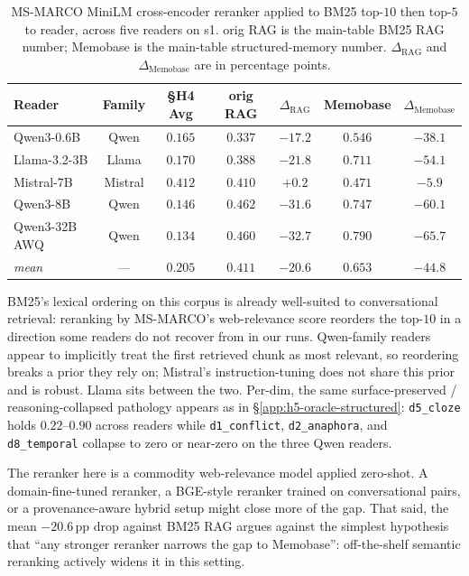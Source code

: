 \begin{table}[h]
\centering
\small
\caption{MS-MARCO MiniLM cross-encoder reranker applied to BM25 top-$10$ then top-$5$ to reader, across five readers on \benchL s1. orig RAG is the main-table BM25 RAG number; Memobase is the main-table structured-memory number. $\Delta_{\text{RAG}}$ and $\Delta_{\text{Memobase}}$ are in percentage points.}
\label{tab:h4-reranker-baseline}
\begin{tabular}{lcccccc}
\toprule
Reader & Family & \S H4 Avg & orig RAG & $\Delta_{\text{RAG}}$ & Memobase & $\Delta_{\text{Memobase}}$ \\
\midrule
Qwen3-0.6B    & Qwen    & $0.165$ & $0.337$ & $-17.2$ & $0.546$ & $-38.1$ \\
Llama-3.2-3B  & Llama   & $0.170$ & $0.388$ & $-21.8$ & $0.711$ & $-54.1$ \\
Mistral-7B    & Mistral & $0.412$ & $0.410$ & $+0.2$  & $0.471$ & $-5.9$  \\
Qwen3-8B      & Qwen    & $0.146$ & $0.462$ & $-31.6$ & $0.747$ & $-60.1$ \\
Qwen3-32B AWQ & Qwen    & $0.134$ & $0.460$ & $-32.7$ & $0.790$ & $-65.7$ \\
\midrule
\emph{mean}   & --- & $0.205$ & $0.411$ & $\mathbf{-20.6}$ & $0.653$ & $\mathbf{-44.8}$ \\
\bottomrule
\end{tabular}
\end{table}

BM25's lexical ordering on this corpus is already well-suited to conversational retrieval: reranking by MS-MARCO's web-relevance score reorders the top-$10$ in a direction some readers do not recover from in our runs. Qwen-family readers appear to implicitly treat the first retrieved chunk as most relevant, so reordering breaks a prior they rely on; Mistral's instruction-tuning does not share this prior and is robust. Llama sits between the two. Per-dim, the same surface-preserved / reasoning-collapsed pathology appears as in \S\ref{app:h5-oracle-structured}: \texttt{d5\_cloze} holds $0.22$--$0.90$ across readers while \texttt{d1\_conflict}, \texttt{d2\_anaphora}, and \texttt{d8\_temporal} collapse to zero or near-zero on the three Qwen readers.

The reranker here is a commodity web-relevance model applied zero-shot. A domain-fine-tuned reranker, a BGE-style reranker trained on conversational pairs, or a provenance-aware hybrid setup might close more of the gap. That said, the mean $-20.6$\,pp drop against BM25 RAG argues against the simplest hypothesis that ``any stronger reranker narrows the gap to Memobase'': off-the-shelf semantic reranking actively widens it in this setting.

